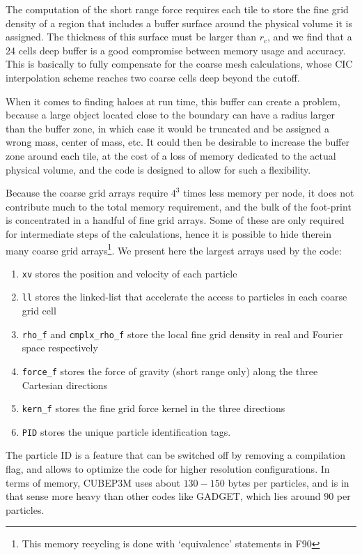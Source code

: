 \documentclass[useAMS,usenatbib]{mn2e}
\begin{document}
The computation of the short range force requires each tile to store the fine grid density of a region that includes a buffer surface around the physical volume it is assigned. The thickness of this surface must be larger than $r_{c}$, and we find that a 24 cells deep buffer
is a good compromise between memory usage and accuracy.
This is basically to fully compensate for the coarse mesh calculations, whose CIC interpolation scheme 
reaches two coarse cells deep beyond the cutoff.   

When it comes to finding haloes at run time, this buffer can create a problem, because a large object located close to the boundary can have a radius larger than the buffer zone, in which case it would be truncated and be assigned a wrong mass, center of mass, etc. 
It could then be desirable to increase the buffer zone around each tile, at the cost of a loss of memory dedicated to the actual physical volume, and the code is designed to allow for such a flexibility.



Because the coarse grid arrays require $4^3$ times less memory per node, 
it does not contribute much to the total memory requirement, and the bulk of the foot-print is 
concentrated in a handful of fine grid arrays.
Some of these are only required for intermediate steps of the calculations, 
hence it is possible to hide therein many coarse grid arrays\footnote{ This memory recycling is done with `equivalence' statements in {\small F90}}.   
We present here the largest arrays used by the code:
\begin{enumerate}
\item{{\tt xv} stores the position and velocity of each particle} 
\item{{\tt ll} stores the linked-list that accelerate the access to particles in each coarse grid cell}
\item{{\tt rho\_f} and {\tt cmplx\_rho\_f} store 
the local fine grid density  in real and Fourier space respectively}
\item{{\tt force\_f} stores the force of gravity (short range only) along the three Cartesian directions}
\item{{\tt kern\_f} stores the fine grid force kernel in the three directions}
\item{{\tt PID} stores the unique particle identification tags.}
\end{enumerate}
The particle ID is a feature that can be switched off by removing a compilation flag, 
and allows to optimize the code for higher resolution configurations.
In terms of memory, {\small CUBEP3M} uses about $130 - 150$ bytes per particles, and is in that sense more heavy than other codes like {\small GADGET}, which 
lies around $90$ per particles.
\end{document}
